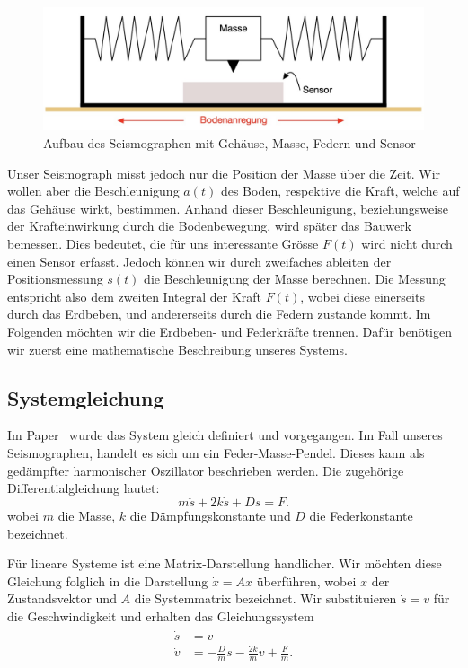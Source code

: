 \begin{figure}
 \begin{center}
 \includegraphics[width=\linewidth,keepaspectratio]{papers/erdbeben/Apperatur}
 \caption{Aufbau des Seismographen mit Gehäuse, Masse, Federn und Sensor}
 \label{erdbeben:Seismograph}
 \end{center}
\end{figure}

Unser Seismograph misst jedoch nur die Position der Masse über die Zeit. 
Wir wollen aber die Beschleunigung $a(t)$ des Boden,
respektive die Kraft,
welche auf das Gehäuse wirkt, bestimmen.  
Anhand dieser Beschleunigung,
beziehungsweise der Krafteinwirkung durch die Bodenbewegung,
wird später das Bauwerk bemessen.
Dies bedeutet, die für uns interessante Grösse $F(t)$ wird nicht durch einen Sensor erfasst. 
Jedoch können wir durch zweifaches ableiten der Positionsmessung $s(t)$ die Beschleunigung der Masse berechnen. 
Die Messung entspricht also dem zweiten Integral der Kraft $F(t)$,
wobei diese einerseits durch das Erdbeben, und andererseits durch die Federn zustande kommt.
Im Folgenden möchten wir die Erdbeben- und Federkräfte trennen.
Dafür benötigen wir zuerst eine mathematische Beschreibung unseres Systems.

\subsection{Systemgleichung}
Im Paper~\cite{erdbeben:mendezmueller} wurde das System gleich definiert und vorgegangen. 
Im Fall unseres Seismographen, handelt es sich um ein Feder-Masse-Pendel.
Dieses kann als gedämpfter harmonischer Oszillator beschrieben werden. 
Die zugehörige Differentialgleichung lautet:
\begin{equation}
	\label{erdbeben:Systemgleichung}
m\ddot s + 2k \dot s + Ds = F.
\end{equation}
wobei $m$ die Masse, $k$ die Dämpfungskonstante und $D$ die Federkonstante bezeichnet.

Für lineare Systeme ist eine Matrix-Darstellung handlicher.
Wir möchten diese Gleichung folglich in die Darstellung $\dot x = Ax$ überführen,
wobei $x$ der Zustandsvektor und $A$ die Systemmatrix bezeichnet.
Wir substituieren $\dot s = v$ für die Geschwindigkeit und erhalten das Gleichungssystem
\begin{align}
  \begin{split}
    \dot s &= v \\ 
    \dot v &= -\frac{D}{m} {s} -\frac{2k}{m} {v} + \frac{F} {m}.
  \end{split}
  \label{erdbenen:systemgleichungen}
\end{align}


